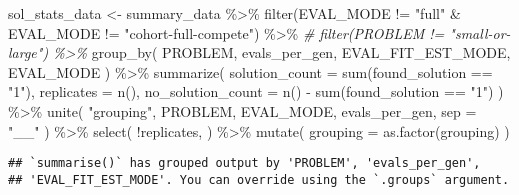 \documentclass[
]{book}
\newenvironment{Shaded}{\begin{snugshade}}{\end{snugshade}}
\newcommand{\AttributeTok}[1]{\textcolor[rgb]{0.77,0.63,0.00}{#1}}
\newcommand{\CommentTok}[1]{\textcolor[rgb]{0.56,0.35,0.01}{\textit{#1}}}
\newcommand{\FunctionTok}[1]{\textcolor[rgb]{0.00,0.00,0.00}{#1}}
\newcommand{\NormalTok}[1]{#1}
\newcommand{\OtherTok}[1]{\textcolor[rgb]{0.56,0.35,0.01}{#1}}
\newcommand{\SpecialCharTok}[1]{\textcolor[rgb]{0.00,0.00,0.00}{#1}}
\newcommand{\StringTok}[1]{\textcolor[rgb]{0.31,0.60,0.02}{#1}}
\begin{document}
\begin{Shaded}
\begin{Highlighting}[]
\NormalTok{sol\_stats\_data }\OtherTok{\textless{}{-}}\NormalTok{ summary\_data }\SpecialCharTok{\%\textgreater{}\%}
  \FunctionTok{filter}\NormalTok{(EVAL\_MODE }\SpecialCharTok{!=} \StringTok{"full"} \SpecialCharTok{\&}\NormalTok{ EVAL\_MODE }\SpecialCharTok{!=} \StringTok{"cohort{-}full{-}compete"}\NormalTok{) }\SpecialCharTok{\%\textgreater{}\%}
  \CommentTok{\# filter(PROBLEM != "small{-}or{-}large") \%\textgreater{}\%}
  \FunctionTok{group\_by}\NormalTok{(}
\NormalTok{    PROBLEM,}
\NormalTok{    evals\_per\_gen,}
\NormalTok{    EVAL\_FIT\_EST\_MODE,}
\NormalTok{    EVAL\_MODE}
\NormalTok{  ) }\SpecialCharTok{\%\textgreater{}\%}
  \FunctionTok{summarize}\NormalTok{(}
    \AttributeTok{solution\_count =} \FunctionTok{sum}\NormalTok{(found\_solution }\SpecialCharTok{==} \StringTok{"1"}\NormalTok{),}
    \AttributeTok{replicates =} \FunctionTok{n}\NormalTok{(),}
    \AttributeTok{no\_solution\_count =} \FunctionTok{n}\NormalTok{() }\SpecialCharTok{{-}} \FunctionTok{sum}\NormalTok{(found\_solution }\SpecialCharTok{==} \StringTok{"1"}\NormalTok{)}
\NormalTok{  ) }\SpecialCharTok{\%\textgreater{}\%}
  \FunctionTok{unite}\NormalTok{(}
    \StringTok{"grouping"}\NormalTok{,}
\NormalTok{    PROBLEM,}
\NormalTok{    EVAL\_MODE,}
\NormalTok{    evals\_per\_gen,}
    \AttributeTok{sep =} \StringTok{"\_\_"}
\NormalTok{  ) }\SpecialCharTok{\%\textgreater{}\%}
  \FunctionTok{select}\NormalTok{(}
    \SpecialCharTok{!}\NormalTok{replicates,}
\NormalTok{  ) }\SpecialCharTok{\%\textgreater{}\%}
  \FunctionTok{mutate}\NormalTok{(}
    \AttributeTok{grouping =} \FunctionTok{as.factor}\NormalTok{(grouping)}
\NormalTok{  )}
\end{Highlighting}
\end{Shaded}

\begin{verbatim}
## `summarise()` has grouped output by 'PROBLEM', 'evals_per_gen',
## 'EVAL_FIT_EST_MODE'. You can override using the `.groups` argument.
\end{verbatim}
\end{document}
